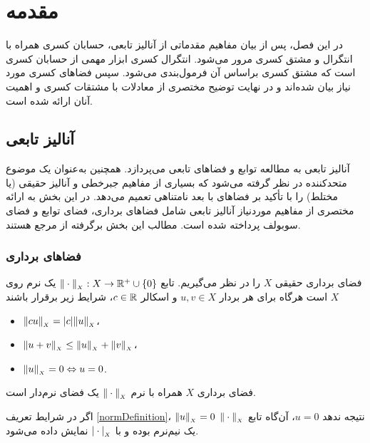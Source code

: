 \chapter{
مقدمه
}
\label{chp:chap1}\thispagestyle{empty}

در این فصل، پس از بیان مفاهیم مقدماتی از آنالیز تابعی، حسابان کسری همراه با انتگرال و مشتق کسری مرور می‌شود.
انتگرال کسری ابزار مهمی از حسابان کسری است که مشتق کسری براساس آن فرمول‌بندی می‌شود.
سپس فضاهای کسری مورد نیاز بیان شده‌اند و در نهایت توضیح مختصری از معادلات با مشتقات کسری و اهمیت آنان ارائه شده است.
\section{
آنالیز تابعی
}
آنالیز تابعی به مطالعه توابع و فضاهای تابعی می‌پردازد.
همچنین به‌عنوان یک موضوع متحدکننده در نظر گرفته می‌شود که بسیاری از مفاهیم جبرخطی و آنالیز حقیقی (یا مختلط) را با تأکید بر فضاهای با بعد نامتناهی تعمیم می‌دهد.
در این بخش به ارائه مختصری از مفاهیم موردنیاز آنالیز تابعی شامل فضاهای برداری، فضای توابع و فضای
سوبولف
پرداخته شده است.
مطالب این بخش برگرفته از مرجع
\cite{Ref111R}
هستند.
\subsection{
فضاهای برداری
}

\begin{definition}
\label{normDefinition}
فضای برداری حقیقی
$X$
را در نظر می‌گیریم.
تابع
$\normS{X}{ \cdot } : X \to \RealPZ$
یک نرم روی
$X$
است هرگاه برای هر بردار
$u,v \in X$
و اسکالر
$c \in \Real$،
شرایط زیر برقرار باشند
\begin{itemize}
\item
$\normS{X}{c u} = \abs{c} \normS{X}{u}$،
\item
$\normS{X}{u + v} \leq \normS{X}{u} + \normS{X}{v}$،
\item
$\normS{X}{u} = 0 \Leftrightarrow u = 0$.
\end{itemize}
فضای برداری
$X$
همراه با نرم
$\normS{X}{\cdot}$
یک فضای نرم‌دار است.

\end{definition}

\begin{note}
اگر در شرایط تعریف
\ref{normDefinition}،
$\normS{X}{u} = 0$
نتیجه ندهد
$u = 0$،
آن‌گاه تابع
$\normS{X}{\cdot}$
یک نیم‌نرم بوده و با
$\absS{X}{\cdot}$
نمایش داده می‌‌شود.
\end{note}

